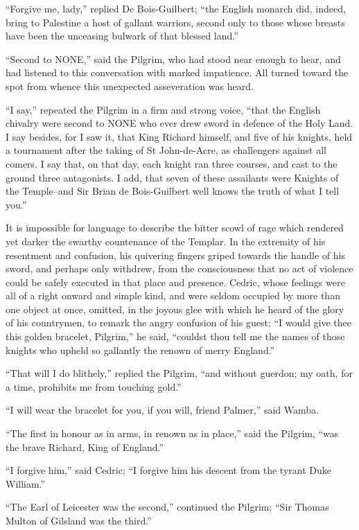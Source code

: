 ``Forgive me, lady,'' replied De Bois-Guilbert; ``the English monarch
did, indeed, bring to Palestine a host of gallant warriors, second only
to those whose breasts have been the unceasing bulwark of that blessed
land.''

``Second to NONE,'' said the Pilgrim, who had stood near enough to hear,
and had listened to this conversation with marked impatience. All turned
toward the spot from whence this unexpected asseveration was heard.

``I say,'' repeated the Pilgrim in a firm and strong voice, ``that the
English chivalry were second to NONE who ever drew sword in defence of
the Holy Land. I say besides, for I saw it, that King Richard himself,
and five of his knights, held a tournament after the taking of St
John-de-Acre, as challengers against all comers. I say that, on that
day, each knight ran three courses, and cast to the ground three
antagonists. I add, that seven of these assailants were Knights of the
Temple--and Sir Brian de Bois-Guilbert well knows the truth of what I
tell you.''

It is impossible for language to describe the bitter scowl of rage which
rendered yet darker the swarthy countenance of the Templar. In the
extremity of his resentment and confusion, his quivering fingers griped
towards the handle of his sword, and perhaps only withdrew, from the
consciousness that no act of violence could be safely executed in that
place and presence. Cedric, whose feelings were all of a right onward
and simple kind, and were seldom occupied by more than one object at
once, omitted, in the joyous glee with which he heard of the glory of
his countrymen, to remark the angry confusion of his guest; ``I would
give thee this golden bracelet, Pilgrim,'' he said, ``couldst thou tell
me the names of those knights who upheld so gallantly the renown of
merry England.''

``That will I do blithely,'' replied the Pilgrim, ``and without guerdon;
my oath, for a time, prohibits me from touching gold.''

``I will wear the bracelet for you, if you will, friend Palmer,'' said
Wamba.

``The first in honour as in arms, in renown as in place,'' said the
Pilgrim, ``was the brave Richard, King of England.''

``I forgive him,'' said Cedric; ``I forgive him his descent from the
tyrant Duke William.''

``The Earl of Leicester was the second,'' continued the Pilgrim; ``Sir
Thomas Multon of Gilsland was the third.''

